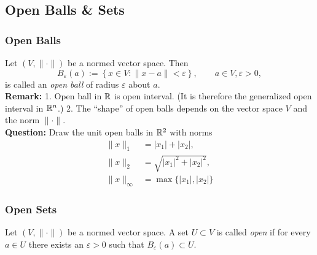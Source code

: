 \documentclass[12pt, t]{beamer}
\renewcommand{\emph}[1]{{\color{Turquoise3}\textsl{#1}}}
\newcommand{\nullspace}{~\\[15pt]}
\begin{document}
\subsection{Open Balls \& Sets}
\begin{frame}
    \frametitle{Open Balls}
    Let $(V,\|\cdot\|)$ be a normed vector space. Then
    \setcounter{equation}{0}
    \begin{equation}\label{2.1.1}
        B_\varepsilon(a):=\left\{x\in V:\|x-a\|<\varepsilon\right\},\qquad a\in V,\varepsilon>0,
    \end{equation}
    is called an \emph{open ball} of radius $\varepsilon$ about $a$.
    \nullspace
    \textbf{Remark:} 1. Open ball in $\mathbb{R}$ is open interval. (It is therefore the generalized open interval in $\mathbb{R}^n$.) 2. The ``shape'' of open balls depends on the vector space $V$ and the norm $\|\cdot\|$.
    \nullspace
    \textbf{Question:} Draw the unit open balls in $\mathbb{R}^2$ with norms
    \begin{equation}\label{2.1.2}
        \begin{aligned}
            \|x\|_1        & =|x_1|+|x_2|,            \\
            \|x\|_2        & =\sqrt{|x_1|^2+|x_2|^2}, \\
            \|x\|_{\infty} & =\max\{|x_1|,|x_2|\}
        \end{aligned}
    \end{equation}
\end{frame}

\begin{frame}
    \frametitle{Open Sets}
    Let $(V,\|\cdot\|)$ be a normed vector space. A set $U\subset V$ is called \emph{open} if for every $a\in U$ there exists an $\varepsilon>0$ such that $B_{\varepsilon}(a)\subset U$.\\
\end{frame}
\end{document}
